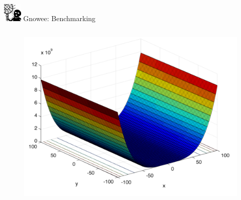 \documentclass[xcolor=x11names,compress,handout]{beamer}
\renewcommand{\(}{\begin{columns}}
\renewcommand{\)}{\end{columns}}
\newcommand{\<}[1]{\begin{column}{#1}}
\renewcommand{\>}{\end{column}}
\begin{document}
\begin{frame}{\includegraphics[width=0.35in]{../figs/Gnowee.png} Gnowee: Benchmarking \cite{Walton2013a,Yang2014,Civicioglu2013}}
\begin{columns}
\begin{column}{0.33\linewidth}
\begin{figure}[htp]
        \vspace{-0.35cm}
      \end{figure}       
      \vspace{-1.15cm} 
      \begin{figure}[htp]
        \centering
        \includegraphics[width=1.0\textwidth, height=0.25\textheight]{../figs/Rosenbrock.png} 
        \vspace{-0.35cm}
      \end{figure}
    \end{column}
  \end{columns}
\end{frame}
\end{document}

